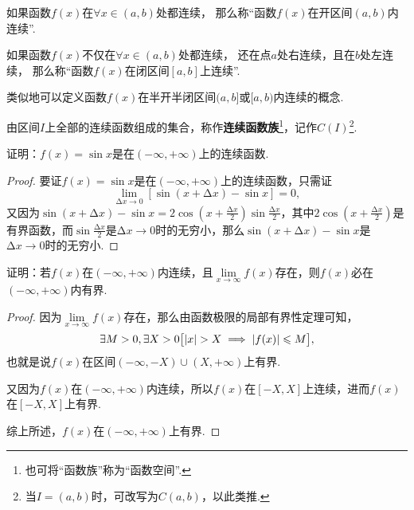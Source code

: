\begin{definition}
如果函数\(f(x)\)在\(\forall x \in (a,b)\)处都连续，%
那么称“函数\(f(x)\)在开区间\((a,b)\)内连续”.

如果函数\(f(x)\)不仅在\(\forall x \in (a,b)\)处都连续，%
还在点\(a\)处右连续，且在\(b\)处左连续，%
那么称“函数\(f(x)\)在闭区间\([a,b]\)上连续”.
\end{definition}
类似地可以定义函数\(f(x)\)在半开半闭区间\((a,b]\)或\([a,b)\)内连续的概念.

\begin{definition}\label{definition:函数族.连续函数族}
由区间\(I\)上全部的连续函数组成的集合，称作\textbf{连续函数族}\footnote{%
也可将“函数族”称为“函数空间”.%
}，记作\(C(I)\)\footnote{%
当\(I=(a,b)\)时，可改写为\(C(a,b)\)，以此类推.%
}.
\end{definition}

\begin{example}
证明：\(f(x) = \sin x\)是在\((-\infty,+\infty)\)上的连续函数.
\begin{proof}
要证\(f(x) = \sin x\)是在\((-\infty,+\infty)\)上的连续函数，只需证\[
\lim\limits_{\increment x\to0} [\sin(x+\increment x) - \sin x] = 0,
\]又因为\(
\sin(x+\increment x) - \sin x
= 2 \cos\left(x+\frac{\increment x}{2}\right) \sin\frac{\increment x}{2}
\)，其中\(2 \cos\left(x+\frac{\increment x}{2}\right)\)是有界函数，而\(\sin\frac{\increment x}{2}\)是\(\increment x\to0\)时的无穷小，那么\(\sin(x+\increment x) - \sin x\)是\(\increment x\to0\)时的无穷小.
\end{proof}
\end{example}

\begin{example}
证明：若\(f(x)\)在\((-\infty,+\infty)\)内连续，且\(\lim\limits_{x \to \infty}f(x)\)存在，则\(f(x)\)必在\((-\infty,+\infty)\)内有界.
\begin{proof}
因为\(\lim\limits_{x \to \infty} f(x)\)存在，那么由函数极限的局部有界性定理可知，\[
\exists M>0,\exists X>0 \bigl[
\abs{x} > X \implies \abs{f(x)} \leqslant M
\bigr],
\]也就是说\(f(x)\)在区间\((-\infty,-X)\cup(X,+\infty)\)上有界.

又因为\(f(x)\)在\((-\infty,+\infty)\)内连续，所以\(f(x)\)在\([-X,X]\)上连续，进而\(f(x)\)在\([-X,X]\)上有界.

综上所述，\(f(x)\)在\((-\infty,+\infty)\)上有界.
\end{proof}
\end{example}

